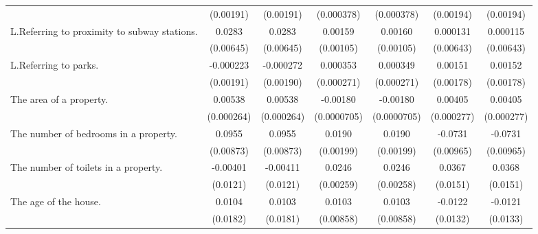 {\begin{tabular}{l*{6}{c}}
                    &   (0.00191)         &   (0.00191)         &  (0.000378)         &  (0.000378)         &   (0.00194)         &   (0.00194)         \\
\addlinespace
L.Referring to proximity to subway stations.&      0.0283\sym{***}&      0.0283\sym{***}&     0.00159         &     0.00160         &    0.000131         &    0.000115         \\
                    &   (0.00645)         &   (0.00645)         &   (0.00105)         &   (0.00105)         &   (0.00643)         &   (0.00643)         \\
\addlinespace
L.Referring to parks.&   -0.000223         &   -0.000272         &    0.000353         &    0.000349         &     0.00151         &     0.00152         \\
                    &   (0.00191)         &   (0.00190)         &  (0.000271)         &  (0.000271)         &   (0.00178)         &   (0.00178)         \\
\addlinespace
The area of a property.&     0.00538\sym{***}&     0.00538\sym{***}&    -0.00180\sym{***}&    -0.00180\sym{***}&     0.00405\sym{***}&     0.00405\sym{***}\\
                    &  (0.000264)         &  (0.000264)         & (0.0000705)         & (0.0000705)         &  (0.000277)         &  (0.000277)         \\
\addlinespace
The number of bedrooms in a property.&      0.0955\sym{***}&      0.0955\sym{***}&      0.0190\sym{***}&      0.0190\sym{***}&     -0.0731\sym{***}&     -0.0731\sym{***}\\
                    &   (0.00873)         &   (0.00873)         &   (0.00199)         &   (0.00199)         &   (0.00965)         &   (0.00965)         \\
\addlinespace
The number of toilets in a property.&    -0.00401         &    -0.00411         &      0.0246\sym{***}&      0.0246\sym{***}&      0.0367\sym{**} &      0.0368\sym{**} \\
                    &    (0.0121)         &    (0.0121)         &   (0.00259)         &   (0.00258)         &    (0.0151)         &    (0.0151)         \\
\addlinespace
The age of the house.&      0.0104         &      0.0103         &      0.0103         &      0.0103         &     -0.0122         &     -0.0121         \\
                    &    (0.0182)         &    (0.0181)         &   (0.00858)         &   (0.00858)         &    (0.0132)         &    (0.0133)         \\

\end{tabular}}
